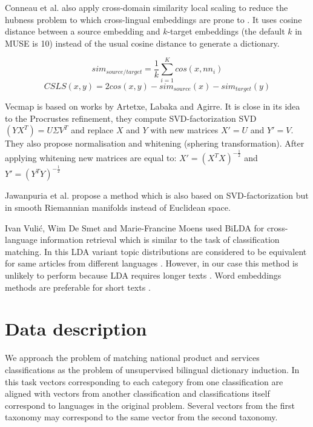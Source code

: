 \documentclass[conference]{IEEEtran}
\begin{document}
Conneau et al. also apply cross-domain similarity local scaling to reduce the hubness problem to which cross-lingual embeddings are prone to \cite{dinu}. It uses cosine distance between a source embedding and $k$-target embeddings (the default $k$ in MUSE is 10) instead of the usual cosine distance to generate a dictionary.

$$sim_{source/target} = \dfrac{1}{k}\sum_{i=1}^Kcos(x, nn_i)$$
$$CSLS(x,y) = 2cos(x,y) - sim_{source}(x)  - sim_{target}(y)$$

Vecmap is based on works by Artetxe, Labaka and Agirre. It is close in its idea to the Procrustes refinement, they compute SVD-factorization SVD$(YX^T) = U\Sigma V^T$ and replace $X$ and $Y$ with new matrices $X' = U$ and $Y' = V$. They also propose normalisation and whitening (sphering transformation). After applying whitening new matrices are equal to:
$X' = (X^TX)^{-\tfrac{1}{2}}$ and $Y' = (Y^TY)^{-\tfrac{1}{2}}$

Jawanpuria et al. \cite{jawanpuria} propose a method which is also based on SVD-factorization but in smooth Riemannian manifolds instead of Euclidean space.

Ivan Vulić, Wim De Smet and Marie-Francine Moens  used BiLDA for cross-language information retrieval which is similar to the task of classification matching. In this LDA variant topic distributions are considered to be equivalent for same articles from different languages \cite{bilda}. However, in our case this method is unlikely to perform because LDA requires longer texts \cite{short-lda}. Word embeddings methods are preferable for short texts \cite{maslova-potapov}.

\section{Data description}
We approach the problem of matching national product and services classifications as the problem of unsupervised bilingual dictionary induction. In this task vectors corresponding to each category from one classification are aligned with vectors from another classification and classifications itself correspond to languages in the original problem. Several vectors from the first taxonomy may correspond to the same vector from the second taxonomy.
\end{document}

